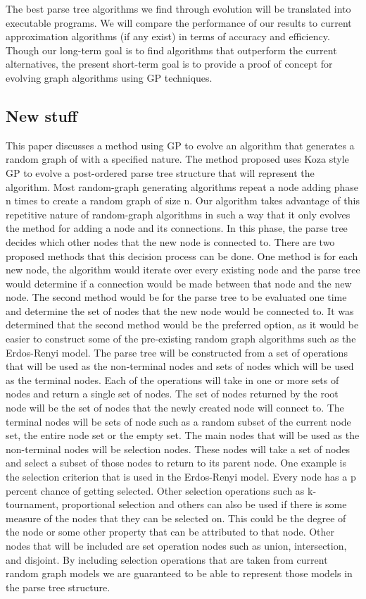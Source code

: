 \documentclass{article}
\begin{document}
The best parse tree algorithms we find through evolution will be translated into executable programs. We will compare the performance of our results to current approximation algorithms (if any exist) in terms of accuracy and efficiency. Though our long-term goal is to find algorithms that outperform the current alternatives, the present short-term goal is to provide a proof of concept for evolving graph algorithms using GP techniques.

\subsection{New stuff}

This paper discusses a method using GP to evolve an algorithm that generates a random graph of with a specified nature.  The method proposed uses Koza style GP to evolve a post-ordered parse tree structure that will represent the algorithm. Most random-graph generating algorithms repeat a node adding phase n times to create a random graph of size n. Our algorithm takes advantage of this repetitive nature of random-graph algorithms in such a way that it only evolves the method for adding a node and its connections. In this phase, the parse tree decides which other nodes that the new node is connected to. 
There are two proposed methods that this decision process can be done. One method is for each new node, the algorithm would iterate over every existing node and the parse tree would determine if a connection would be made between that node and the new node. The second method would be for the parse tree to be evaluated one time and determine the set of nodes that the new node would be connected to.  It was determined that the second method would be the preferred option, as it would be easier to construct some of the pre-existing random graph algorithms such as the Erdos-Renyi model. 
The parse tree will be constructed from a set of operations that will be used as the non-terminal nodes and sets of nodes which will be used as the terminal nodes.  Each of the operations will take in one or more sets of nodes and return a single set of nodes. The set of nodes returned by the root node will be the set of nodes that the newly created node will connect to. The terminal nodes will be sets of node such as a random subset of the current node set, the entire node set or the empty set. 
The main nodes that will be used as the non-terminal nodes will be selection nodes. These nodes will take a set of nodes and select a subset of those nodes to return to its parent node. One example is the selection criterion that is used in the Erdos-Renyi model. Every node has a p percent chance of getting selected.  Other selection operations such as k-tournament, proportional selection and others can also be used if there is some measure of the nodes that they can be selected on. This could be the degree of the node or some other property that can be attributed to that node.  Other nodes that will be included are set operation nodes such as union, intersection, and disjoint.  By including selection operations that are taken from current random graph models we are guaranteed to be able to represent those models in the parse tree structure.
\end{document}
